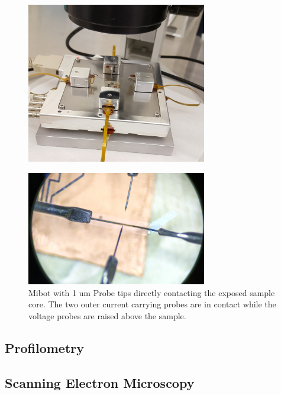\begin{figure}[t]
  \centering
    \includegraphics[width=0.7\textwidth]{fig/MiBots/setup.jpg}
 \caption{}
\label{mibot}
\end{figure}

\begin{figure}[t]
  \centering
    \includegraphics[width=0.7\textwidth]{fig/MiBots/IMG_20190409_143016.jpg}
 \caption{ Mibot with 1 um Probe tips directly contacting the exposed sample core. The two outer current carrying probes are in contact while the voltage probes are raised above the sample.}
\label{mibot1}
\end{figure}



\subsection{Profilometry}
\subsection{Scanning Electron Microscopy}
\cleardoublepage
